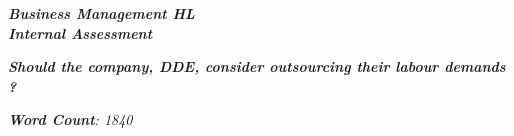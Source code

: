 

\begin{titlepage}
    \begin{center}
        \vspace*{1cm}
            
        \date{}
            
        \huge
            
        \textit{\textbf{Business Management HL \\ Internal Assessment}}
            
        \vspace{0.25cm}
            
            
        \vspace{2.5cm}
            
            
            
        \vspace{2.5cm}
            
        \LARGE
            
        \textit{\textbf{Should the company, DDE, consider outsourcing their labour demands ?}}


		\vspace{1.5cm}
            
        \vspace{2.5cm}
            
        \Large
            
        \vspace{0.25cm}
        

		\vspace{1cm}            
            
		\Large		
		        
		\vspace{0.25cm} 
		


		\textit{\textbf{Word Count}: 1840}
		   

\end{center}
\end{titlepage}
